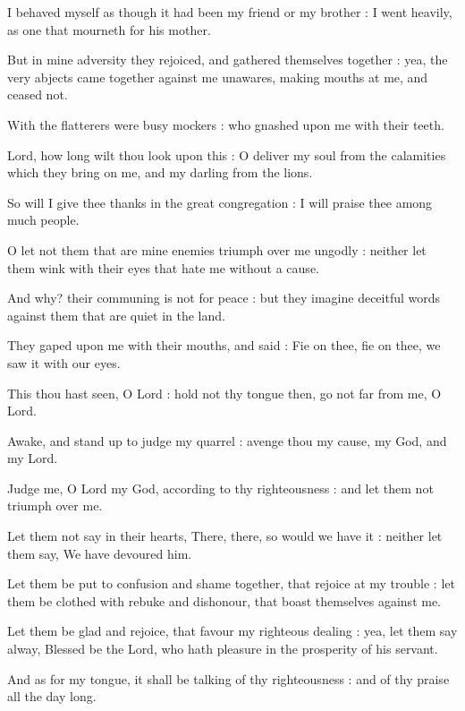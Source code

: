 I behaved myself as though it had been my friend or my brother : I went heavily, as one that mourneth for his mother.\par
{}But in mine adversity they rejoiced, and gathered themselves together : yea, the very abjects came together against me unawares, making mouths at me, and ceased not.\par
{}With the flatterers were busy mockers : who gnashed upon me with their teeth.\par
{}Lord, how long wilt thou look upon this : O deliver my soul from the calamities which they bring on me, and my darling from the lions.\par
{}So will I give thee thanks in the great congregation : I will praise thee among much people.\par
{}O let not them that are mine enemies triumph over me ungodly : neither let them wink with their eyes that hate me without a cause.\par
{}And why? their communing is not for peace : but they imagine deceitful words against them that are quiet in the land.\par
{}They gaped upon me with their mouths, and said : Fie on thee, fie on thee, we saw it with our eyes.\par
{}This thou hast seen, O Lord : hold not thy tongue then, go not far from me, O Lord.\par
{}Awake, and stand up to judge my quarrel : avenge thou my cause, my God, and my Lord.\par
{}Judge me, O Lord my God, according to thy righteousness : and let them not triumph over me.\par
{}Let them not say in their hearts, There, there, so would we have it : neither let them say, We have devoured him.\par
{}Let them be put to confusion and shame together, that rejoice at my trouble : let them be clothed with rebuke and dishonour, that boast themselves against me.\par
{}Let them be glad and rejoice, that favour my righteous dealing : yea, let them say alway, Blessed be the Lord, who hath pleasure in the prosperity of his servant.\par
{}And as for my tongue, it shall be talking of thy righteousness : and of thy praise all the day long.\par

